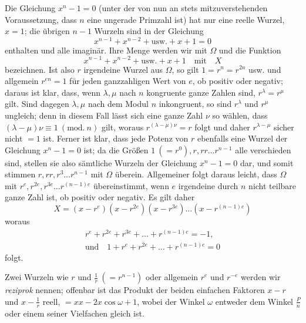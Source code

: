 Die Gleichung \(x^n-1=0\) (unter der von nun an stets mitzuverstehenden Voraussetzung, dass \(n\) eine ungerade Primzahl ist) hat nur eine reelle Wurzel, \(x=1\); die übrigen \(n-1\) Wurzeln sind in der Gleichung \[x^{n-1}+x^{n-2}+\mathrm{usw.}+x+1=0\] enthalten und alle imaginär. Ihre Menge werden wir mit \(\Omega\) und die Funktion \[x^{n-1}+x^{n-2}+\mathrm{usw.}+x+1\quad\text{mit}\quad X\]
bezeichnen. Ist also \(r\) irgendeine Wurzel aus \(\Omega\), so gilt \(1=r^n=r^{2n}\) usw. und allgemein \(r^{en}=1\) für jeden ganzzahligen Wert von \(e\), ob positiv oder negativ; daraus ist klar, dass, wenn \(\lambda,\allowbreak \mu\) nach \(n\) kongruente ganze Zahlen sind, \(r^\lambda=r^\mu\) gilt. Sind dagegen \(\lambda,\allowbreak \mu\) nach dem Modul \(n\) inkongruent, so sind \(r^\lambda\) und \(r^\mu\) ungleich; denn in diesem Fall lässt sich eine ganze Zahl \(\nu\) so wählen, dass \((\lambda-\mu)\nu\equiv1\ (\mathrm{mod.}\ n)\) gilt, woraus \(r^{(\lambda-\mu)\nu}=r\) folgt und daher \(r^{\lambda-\mu}\) sicher nicht \(=1\) ist. Ferner ist klar, dass jede Potenz von \(r\) ebenfalls eine Wurzel der Gleichung \(x^n-1=0\) ist; da die Größen \(1\ (=r^0),\allowbreak r,\allowbreak rr\ldots r^{n-1}\) alle verschieden sind, stellen sie also sämtliche Wurzeln der Gleichung \(x^n-1=0\) dar, und somit stimmen \(r,\allowbreak rr,\allowbreak r^3\ldots r^{n-1}\) mit \(\Omega\) überein. Allgemeiner folgt daraus leicht, dass \(\Omega\) mit \(r^e,\allowbreak r^{2e},\allowbreak r^{3e}\ldots r^{(n-1)e}\) übereinstimmt, wenn \(e\) irgendeine durch \(n\) nicht teilbare ganze Zahl ist, ob positiv oder negativ. Es gilt daher \[X=(x-r^e)(x-r^{2e})(x-r^{3e})\ldots(x-r^{(n-1)e})\] woraus \[\begin{gathered}
r^e+r^{2e}+r^{3e}+\ldots+r^{(n-1)e}=-1,\\
\text{und}\quad1+r^e+r^{2e}+\ldots+r^{(n-1)e}=0
\end{gathered}\] folgt.

Zwei Wurzeln wie \(r\) und \(\frac1r\ (=r^{n-1})\) oder allgemein \(r^e\) und \(r^{-e}\) werden wir \textit{reziprok} nennen; offenbar ist das Produkt der beiden einfachen Faktoren \(x-r\) und \(x-\frac1r\) reell, \(=xx-2x\cos\omega+1\), wobei der Winkel \(\omega\) entweder dem Winkel \(\frac Pn\) oder einem seiner Vielfachen gleich ist.

